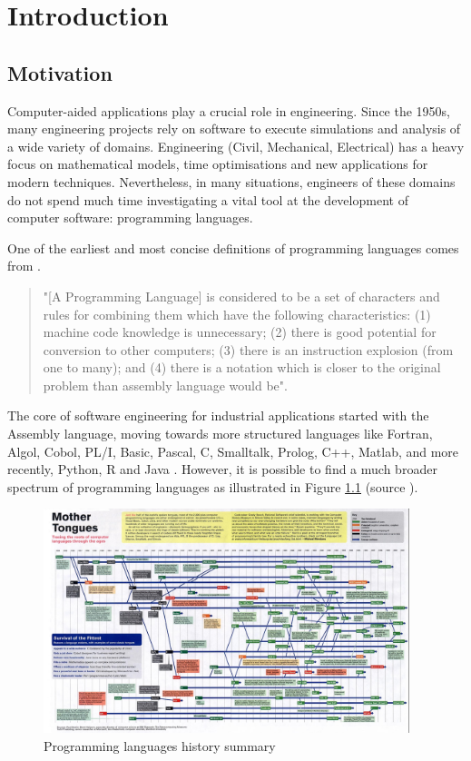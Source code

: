 \chapter{Introduction}
\label{sec:introduction}

\section{Motivation}

Computer-aided applications play a crucial role in engineering. Since the 1950s, many engineering projects rely on software to execute simulations and analysis of a wide variety of domains. Engineering (Civil, Mechanical, Electrical) has a heavy focus on mathematical models, time optimisations and new applications for modern techniques. Nevertheless, in many situations, engineers of these domains do not spend much time investigating a vital tool at the development of computer software: programming languages. 

One of the earliest and most concise definitions of programming languages comes from \cite{sammet1972programming}. 
\begin{quote}
"[A Programming Language] is considered to be a set of characters and rules for combining them which have the following characteristics: (1) machine code knowledge is unnecessary; (2) there is good potential for conversion to other computers; (3) there is an instruction explosion (from one to many); and (4) there is a notation which is closer to the original problem than assembly language would be".
\end{quote}


The core of software engineering for industrial applications started with the Assembly language, moving towards more structured languages like Fortran, Algol, Cobol, PL/I, Basic, Pascal, C, Smalltalk, Prolog, C++, Matlab, and more recently, Python, R and Java \cite{parker2012history}. However, it is possible to find a much broader spectrum of programming languages as illustrated in Figure \ref{histprog} (source \cite{ibmpl}).

\begin{figure}[H]
   \centering
   \includegraphics[angle=90,origin=c,width=0.95\textwidth]{img/histprog.jpeg}
   \caption{Programming languages history summary}
   \label{histprog}
\end{figure}


